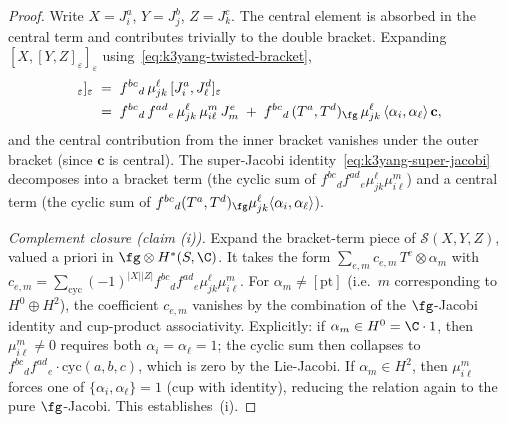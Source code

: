 \begin{proof}
Write $X = J^a_i$, $Y = J^b_j$, $Z = J^c_k$. The central element is
absorbed in the central term and contributes trivially to the
double bracket. Expanding
$[X, [Y, Z]_{\varepsilon}]_{\varepsilon}$
using~\eqref{eq:k3yang-twisted-bracket},
\begin{align*}
 [J^a_i,\; [J^b_j, J^c_k]_{\varepsilon}]_{\varepsilon}
 \;&=\; f^{bc}{}_d\, \mu^\ell_{jk}\,
 [J^a_i, J^d_\ell]_{\varepsilon} \\
 \;&=\; f^{bc}{}_d\, f^{ad}{}_e\, \mu^\ell_{jk}\, \mu^m_{i\ell}\, J^e_m
 \;+\; f^{bc}{}_d\,(T^a, T^d)_{\fg}\, \mu^\ell_{jk}\,
 \langle \alpha_i, \alpha_\ell\rangle\, \mathbf c,
\end{align*}
and the central contribution from the inner bracket vanishes under
the outer bracket (since $\mathbf c$ is central). The super-Jacobi
identity~\eqref{eq:k3yang-super-jacobi} decomposes into a bracket
term (the cyclic sum of
$f^{bc}{}_d f^{ad}{}_e \mu^\ell_{jk} \mu^m_{i\ell}$) and a central
term (the cyclic sum of
$f^{bc}{}_d (T^a, T^d)_{\fg} \mu^\ell_{jk}
 \langle \alpha_i, \alpha_\ell\rangle$).

\emph{Complement closure (claim (i)).} Expand the bracket-term
piece of $\mathcal S(X, Y, Z)$, valued a priori in $\fg \otimes
H^*(S, \C)$. It takes the form $\sum_{e, m} c_{e, m}\, T^e \otimes
\alpha_m$ with
$c_{e, m} = \sum_{\mathrm{cyc}} (-1)^{|X||Z|}
 f^{bc}{}_d f^{ad}{}_e \mu^\ell_{jk} \mu^m_{i\ell}$.
For $\alpha_m \neq [\mathrm{pt}]$ (i.e.\ $m$ corresponding to
$H^0 \oplus H^2$), the coefficient $c_{e, m}$ vanishes by the
combination of the $\fg$-Jacobi identity and cup-product
associativity. Explicitly: if $\alpha_m \in H^0 = \C \cdot 1$, then
$\mu^m_{i\ell} \neq 0$ requires both $\alpha_i = \alpha_\ell = 1$;
the cyclic sum then collapses to $f^{bc}{}_d f^{ad}{}_e \cdot
\mathrm{cyc}(a, b, c)$, which is zero by the Lie-Jacobi. If
$\alpha_m \in H^2$, then $\mu^m_{i\ell}$ forces one of
$\{\alpha_i, \alpha_\ell\} = 1$ (cup with identity), reducing the
relation again to the pure $\fg$-Jacobi. This establishes~(i).


\end{proof}
